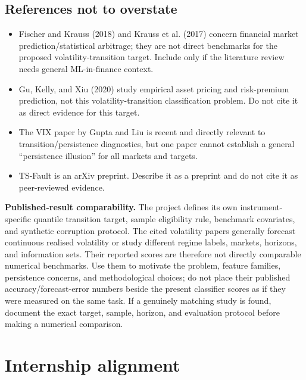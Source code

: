 \documentclass[11pt,a4paper]{article}
\begin{document}
\subsection{References not to overstate}

\begin{itemize}
  \item Fischer and Krauss (2018) and Krauss et al. (2017) concern financial market prediction/statistical arbitrage; they are not direct benchmarks for the proposed volatility-transition target. Include only if the literature review needs general ML-in-finance context.
  \item Gu, Kelly, and Xiu (2020) study empirical asset pricing and risk-premium prediction, not this volatility-transition classification problem. Do not cite it as direct evidence for this target.
  \item The VIX paper by Gupta and Liu is recent and directly relevant to transition/persistence diagnostics, but one paper cannot establish a general ``persistence illusion'' for all markets and targets.
  \item TS-Fault is an arXiv preprint. Describe it as a preprint and do not cite it as peer-reviewed evidence.
\end{itemize}

\begin{warningbox}
\textbf{Published-result comparability.} The project defines its own instrument-specific quantile transition target, sample eligibility rule, benchmark covariates, and synthetic corruption protocol. The cited volatility papers generally forecast continuous realised volatility or study different regime labels, markets, horizons, and information sets. Their reported scores are therefore not directly comparable numerical benchmarks. Use them to motivate the problem, feature families, persistence concerns, and methodological choices; do not place their published accuracy/forecast-error numbers beside the present classifier scores as if they were measured on the same task. If a genuinely matching study is found, document the exact target, sample, horizon, and evaluation protocol before making a numerical comparison.
\end{warningbox}

\section{Internship alignment}
\label{sec:internship}
\end{document}
